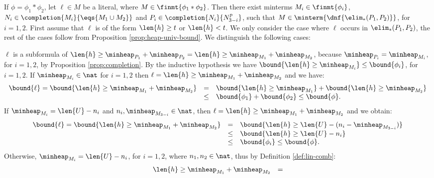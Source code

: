 {\begin{compactitem}
  \item If $\phi=\phi_1*\phi_2$, let $\ell \in M$ be a literal, where
    $M \in \finmt{\phi_1*\phi_2}$. Then there exist minterms $M_i \in
    \finmt{\phi_i}$, $N_i \in \completion{M_i}{\eqs{M_1\cup M_2}}$ and
    $P_i \in \completion{N_i}{N_{3-i}^p}$, such that $M \in
    \minterm{\dnf{\elim_*(P_1,P_2)}}$, for $i=1,2$. First assume that $\ell$
    is of the form $\len{h} \geq t$ or $\len{h} < t$.  We only
    consider the case where $\ell$ occurs in $\elim_*(P_1,P_2)$, the
    rest of the cases follow from Proposition
    \ref{prop:heap-univ-bound}. We distinguish the following
    cases: \begin{compactitem}
      \item $\ell$ is a subformula of $\len{h} \geq \minheap_{P_1} +
        \minheap_{P_2} = \len{h} \geq \minheap_{M_1} +
        \minheap_{M_2}$, because $\minheap_{P_i} = \minheap_{M_i}$,
        for $i=1,2$, by Proposition \ref{prop:completion}. By the
        inductive hypothesis we have $\bound{\len{h} \geq
          \minheap_{M_i}} \leq \bound{\phi_i}$, for $i=1,2$. If
        $\minheap_{M_i} \in \nat$ for $i=1,2$ then $\ell = \len{h}
        \geq \minheap_{M_1} + \minheap_{M_2}$ and we have: 
        \[\begin{array}{rcl}
        \bound{\ell} = \bound{\len{h} \geq \minheap_{M_1} + \minheap_{M_2}} 
        & = & \bound{\len{h} \geq \minheap_{M_1}} + \bound{\len{h} \geq \minheap_{M_2}} \\
        & \leq & \bound{\phi_1} + \bound{\phi_2} \leq \bound{\phi}.
        \end{array}\] 
        If $\minheap_{M_i} = \len{U} - n_i$ and $n_i,
        \minheap_{M_{3-i}} \in \nat$, then $\ell = \len{h} \geq
        \minheap_{M_1} + \minheap_{M_2}$ and we obtain:
        \[\begin{array}{rcl}
        \bound{\ell} = \bound{\len{h} \geq \minheap_{M_1} + \minheap_{M_2}} 
        & = & \bound{\len{h} \geq \len{U} - (n_i - \minheap_{M_{3-i}})} \\
        & \leq & \bound{\len{h} \geq \len{U} - n_i} \\
        & \leq & \bound{\phi_i} \leq \bound{\phi}.
        \end{array}\] 
        Otherwise, $\minheap_{M_i} = \len{U} - n_i$, for $i=1,2$,
        where $n_1,n_2 \in \nat$, thus by Definition \ref{def:lin-comb}:
        \[\begin{array}{ll}
        \len{h} \geq \minheap_{M_1} + \minheap_{M_2} & = \\ 

\end{array}\]
\end{compactitem}
\end{compactitem}}
